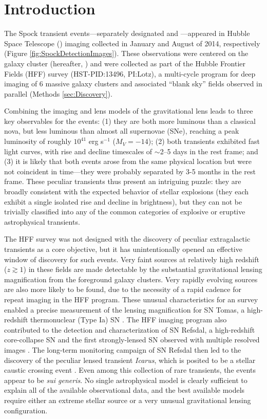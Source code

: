 \section{Introduction}\label{sec:Introduction}

The Spock transient events---separately designated \spockone and
\spocktwo---appeared in Hubble Space Telescope (\HST) imaging
collected in January and August of 2014, respectively (Figure
\ref{fig:SpockDetectionImages}).  These observations were centered on
the galaxy cluster  (hereafter, ) and were collected
as part of the Hubble Frontier Fields (HFF) survey (HST-PID:13496,
PI:Lotz), a multi-cycle program for deep imaging of 6 massive galaxy
clusters and associated ``blank sky'' fields observed in parallel
(Methods \ref{sec:Discovery}).

Combining the \HST imaging and lens models of the  gravitational
lens leads to three key observables for the \spock events: (1) they are
both more luminous than a classical nova, but less luminous than
almost all supernovae (SNe), reaching a peak luminosity of roughly
$10^{41}$ erg s$^{-1}$ ($M_V=−14$); (2) both transients exhibited fast
light curves, with rise and decline timescales of $\sim$2--5 days in
the rest frame; and (3) it is likely that both events arose from the
same physical location but were not coincident in time---they were
probably separated by 3-5 months in the rest frame. These peculiar
transients thus present an intriguing puzzle: they are broadly
consistent with the expected behavior of stellar explosions (they each
exhibit a single isolated rise and decline in brightness), but they
can not be trivially classified into any of the common categories of
explosive or eruptive astrophysical transients.  

The HFF survey was not designed with the discovery of peculiar
extragalactic transients as a core objective, but it has
unintentionally opened an effective window of discovery for such
events.  Very faint sources at relatively high redshift ($z\gtrsim1$)
in these fields are made detectable by the substantial gravitational
lensing magnification from the foreground galaxy clusters.  Very
rapidly evolving sources are also more likely to be found, due to the
necessity of a rapid cadence for repeat imaging in the HFF program.
These unusual characteristics for an \HST survey enabled a precise
measurement of the lensing magnification for SN Tomas, a high-redshift
thermonuclear (Type Ia) SN \citep{Rodney:2015a}.  The HFF imaging
program also contributed to the detection and characterization of SN
Refsdal, a high-redshift core-collapse SN and the first
strongly-lensed SN observed with multiple resolved images
\citep{Kelly:2015a}.  The long-term monitoring campaign of SN Refsdal
then led to the discovery of the peculiar lensed transient {\it
  Icarus}, which is posited to be a stellar caustic crossing event
\citep{Kelly:2017}.  Even among this collection of rare transients,
the \spock events appear to be {\it sui generis}.  No single
astrophysical model is clearly sufficient to explain all of the
available observational data, and the best available models require
either an extreme stellar source or a very unusual gravitational
lensing configuration.

